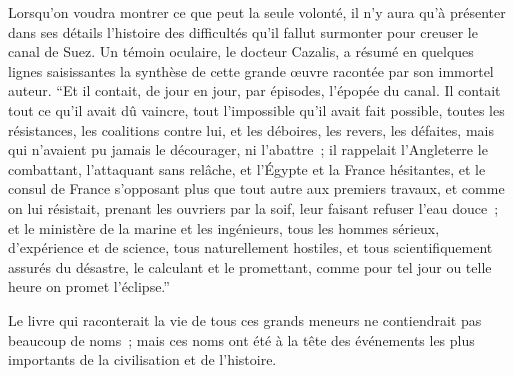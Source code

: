 \documentclass[french,twoside]{book} %
\begin{document}
Lorsqu’on voudra montrer ce que peut la seule volonté, il n’y aura qu’à présenter dans ses détails l’histoire des difficultés qu’il fallut surmonter pour creuser le canal de Suez. Un témoin oculaire, le docteur Cazalis, a résumé en quelques lignes saisissantes la synthèse de cette grande œuvre racontée par son immortel auteur. “Et il contait, de jour en jour, par épisodes, l’épopée du canal. Il contait tout ce qu’il avait dû vaincre, tout l’impossible qu’il avait fait possible, toutes les résistances, les coalitions contre lui, et les déboires, les revers, les défaites, mais qui n’avaient pu jamais le décourager, ni l’abattre ; il rappelait l’Angleterre le combattant, l’attaquant sans relâche, et l’Égypte et la France hésitantes, et le consul de France s’opposant plus que tout autre aux premiers travaux, et comme on lui résistait, prenant les ouvriers par la soif, leur faisant refuser l’eau douce ; et le ministère de la marine et les ingénieurs, tous les hommes sérieux, d’expérience et de science, tous naturellement hostiles, et tous scien­tifiquement assurés du désastre, le calculant et le promettant, comme pour tel jour ou telle heure on promet l’éclipse.”\par
Le livre qui raconterait la vie de tous ces grands meneurs ne contiendrait pas beaucoup de noms ; mais ces noms ont été à la tête des événements les plus impor­tants de la civilisation et de l’histoire.
\end{document}
